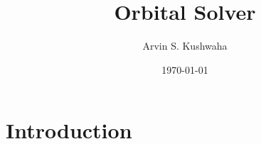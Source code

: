 \documentclass[11pt]{article}
\title{Orbital Solver}
\author{Arvin S. Kushwaha}
\date{\today}
\begin{document}
    \maketitle
    \tableofcontents

    \section{Introduction}

    
    
\end{document}
